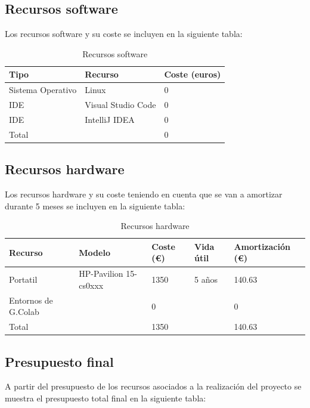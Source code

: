 \subsection{Recursos software}\label{subsec:recursos-software}
Los recursos software y su coste se incluyen en la siguiente tabla:

\begin{table}[H]
    \centering
    \begin{tabular}{|l|l|l|}
        \hline
        \textbf{Tipo} & \textbf{Recurso} & \textbf{Coste (euros)} \\
        \hline
        Sistema Operativo & Linux & 0 \\
        \hline
        IDE & Visual Studio Code & 0 \\
        \hline
        IDE & IntelliJ IDEA & 0 \\
        \hline
        \hline
        Total &  & 0 \\
        \hline
    \end{tabular}
    \caption{Recursos software}
    \label{tab:tabla_recursos_software}
\end{table}

\subsection{Recursos hardware}\label{subsec:recursos-hardware}
Los recursos hardware y su coste teniendo en cuenta que se van a amortizar durante 5 meses
se incluyen en la siguiente tabla:

\begin{table}[H]
    \centering
    \begin{tabular}{|l|l|l|l|l|}
        \hline
        \textbf{Recurso} & \textbf{Modelo} &  \textbf{Coste (€)} & \textbf{Vida útil} & \textbf{Amortización (€)} \\
        \hline
        Portatil & HP-Pavilion 15-cs0xxx & 1350 & 5 años & 140.63 \\
        \hline
        Entornos de G.Colab &  & 0 & & 0 \\
        \hline
        \hline
        Total &  & 1350 &  & 140.63 \\
        \hline
    \end{tabular}
    \caption{Recursos hardware}
    \label{tab:tabla_recursos_hardware}
\end{table}


\subsection{Presupuesto final}\label{subsec:presupuesto-final}
A partir del presupuesto de los recursos asociados a la realización del proyecto se muestra el presupuesto total final
en la siguiente tabla:

